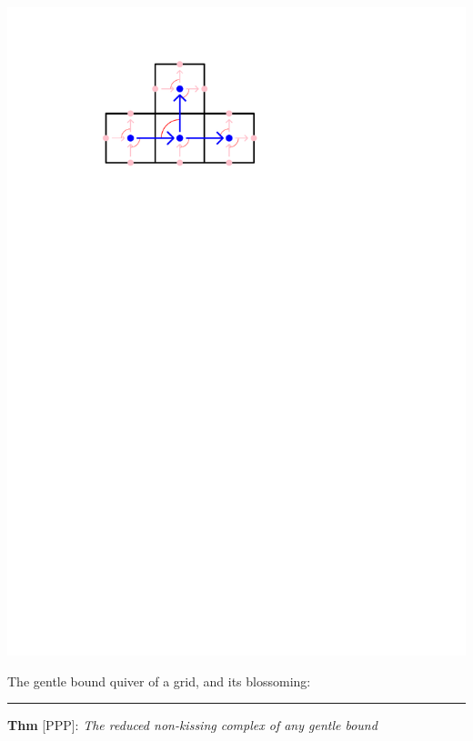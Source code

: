 \documentclass[portrait,final,a0paper,fontscale=0.25]{baposter}
\theoremstyle{definition}
\begin{document}
\begin{poster}
{\vspace*{-.6cm}\hspace*{6cm}\includegraphics[scale=.4]{BlossomingQuiverGrid}

\vspace*{-1cm}
\begin{minipage}{5.5cm}
 The gentle bound quiver of a grid, and its blossoming: 
\end{minipage}

\vspace{.15cm}
\hspace{-.25cm}
{\color{green} \rule{10.02cm}{1pt}}
\vspace{-.35cm}

{\color{green} \bf Thm} [PPP]: {\it The reduced non-kissing complex of any gentle bound} 
\hspace*{1.95cm}{\it quiver is pure and thin.}

}
\end{poster}
\end{document}
